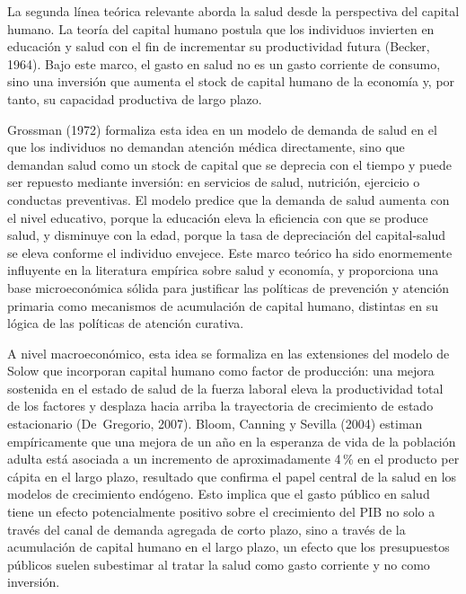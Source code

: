 \documentclass[12pt]{article}
\begin{document}
La segunda línea teórica relevante aborda la salud desde la perspectiva del capital humano. La
teoría del capital humano postula que los individuos invierten en educación y salud con el fin de
incrementar su productividad futura (Becker, 1964). Bajo este marco, el gasto en salud no es un
gasto corriente de consumo, sino una inversión que aumenta el stock de capital humano de la
economía y, por tanto, su capacidad productiva de largo plazo.

Grossman (1972) formaliza esta idea en un modelo de demanda de salud en el que los individuos
no demandan atención médica directamente, sino que demandan salud como un stock de capital que
se deprecia con el tiempo y puede ser repuesto mediante inversión: en servicios de salud, nutrición,
ejercicio o conductas preventivas. El modelo predice que la demanda de salud aumenta con el nivel
educativo, porque la educación eleva la eficiencia con que se produce salud, y disminuye con la
edad, porque la tasa de depreciación del capital-salud se eleva conforme el individuo envejece. Este
marco teórico ha sido enormemente influyente en la literatura empírica sobre salud y economía, y
proporciona una base microeconómica sólida para justificar las políticas de prevención y atención
primaria como mecanismos de acumulación de capital humano, distintas en su lógica de las
políticas de atención curativa.

A nivel macroeconómico, esta idea se formaliza en las extensiones del modelo de Solow que
incorporan capital humano como factor de producción: una mejora sostenida en el estado de salud
de la fuerza laboral eleva la productividad total de los factores y desplaza hacia arriba la trayectoria
de crecimiento de estado estacionario (De~Gregorio, 2007). Bloom, Canning y Sevilla (2004)
estiman empíricamente que una mejora de un año en la esperanza de vida de la población adulta
está asociada a un incremento de aproximadamente 4\,\% en el producto per cápita en el largo
plazo, resultado que confirma el papel central de la salud en los modelos de crecimiento endógeno.
Esto implica que el gasto público en salud tiene un efecto potencialmente positivo sobre el
crecimiento del PIB no solo a través del canal de demanda agregada de corto plazo, sino a través de
la acumulación de capital humano en el largo plazo, un efecto que los presupuestos públicos suelen
subestimar al tratar la salud como gasto corriente y no como inversión.
\end{document}
